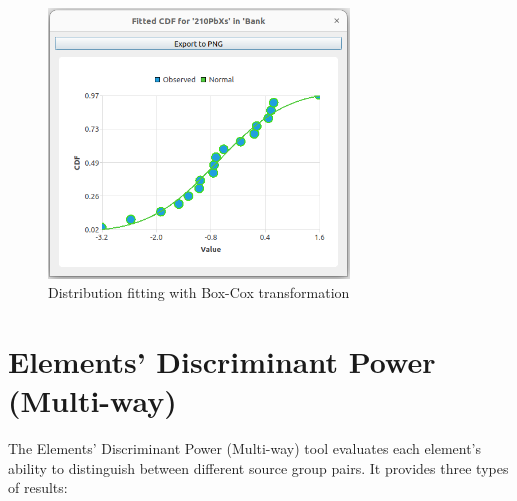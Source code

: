 \documentclass[12pt]{report}
\begin{document}
\begin{figure}[ht]
    \centering
    \includegraphics[width=8cm]{Figures/DF_graph_BoxCox.png} 
    \caption{Distribution fitting with Box-Cox transformation}
    \label{fig:DF_results_BoxCox}
\end{figure}
\FloatBarrier

\section{Elements' Discriminant Power (Multi-way)}
The Elements' Discriminant Power (Multi-way) tool evaluates each element's ability to distinguish between different source group pairs. It provides three types of results:
\end{document}
